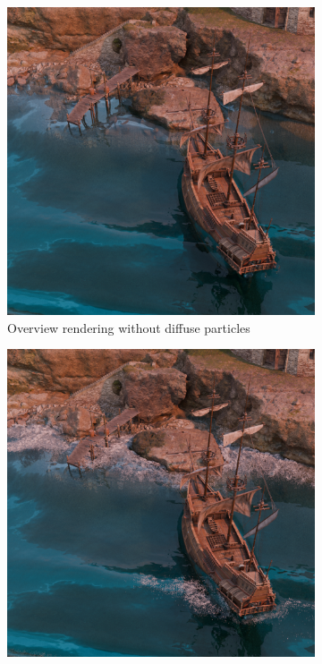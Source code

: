 \documentclass[oneside, a4paper]{book}
\begin{document}
\begin{figure}
    \begin{subfigure}[t][0.5\textwidth]{0.5\textwidth}
      \includegraphics[width=\textwidth]{images/foam-top-without.png}
      \caption{Overview rendering without diffuse particles}
      \label{fig:foam-c}
    \end{subfigure}%
    \begin{subfigure}[t][0.5\textwidth]{0.5\textwidth}
      \includegraphics[width=\textwidth]{images/foam-top-with.png}

\end{subfigure}
\end{figure}
\end{document}
